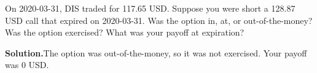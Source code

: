 \noindent On 2020-03-31, DIS traded for 117.65 USD. Suppose you were short a 128.87 USD call that expired on 2020-03-31. Was the option in, at, or out-of-the-money? Was the option exercised? What was your payoff at expiration?

\vspace{9pt} 

\textbf{Solution.}The option was out-of-the-money, so it was not exercised. Your payoff was 0 USD.
